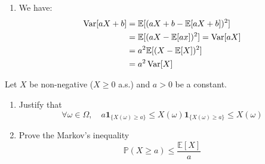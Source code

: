 \begin{solution}
\begin{enumerate}
    \item We have:
          \begin{align*}
            \operatorname{Var}[aX + b] & = \mathbb{E}[(aX+b - \mathbb{E}[aX+b])^2]        \\
                         & = \mathbb{E}[(aX - \mathbb{E}[ax])^2] = \operatorname{Var}[aX] \\
                         & = a^2 \mathbb{E}[(X - \mathbb{E}[X])^2]          \\
                         & = a^2 \operatorname{Var}[X]
          \end{align*}
  \end{enumerate}
\end{solution}

\begin{Exercise}
  Let $X$ be non-negative ($X \geq 0$ a.s.) and $a>0$ be a constant.
  \begin{enumerate}
    \item Justify that
          \[ \forall \omega \in \Omega, \quad a \mathbf{1}_{\{X(\omega) \geqslant a\}} \leqslant X(\omega) \mathbf{1}_{\{X(\omega) \geqslant a\}} \leqslant X(\omega) \]
    \item Prove the Markov's inequality
          \[
            \mathbb{P}(X \geq a) \leq \frac{\mathbb{E}[X]}{a}
          \]
  \end{enumerate}
\end{Exercise}

